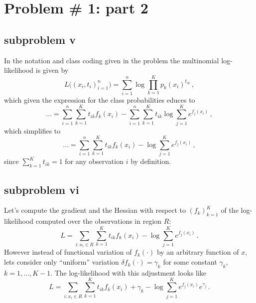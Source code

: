 \documentclass[a4paper]{article}
\begin{document}

\section{Problem \# 1: part 2} %
\label{sec:problem_1_part_2}

\subsection{subproblem v} %
\label{sub:subproblem_v}

In the notation and class coding given in the problem the multinomial log-likelihood
is given by
\[
L\bigl((x_i,t_i)_{i=1}^n\bigr) = \sum_{i=1}^n \log \prod_{k=1}^K p_k(x_i)^{t_{ik}} \,,
\]
which given the expression for the class probabilities educes to
\[
\ldots
= \sum_{i=1}^n \sum_{k=1}^K t_{ik} f_k(x_i)
- \sum_{i=1}^n \sum_{k=1}^K t_{ik} \log \sum_{j=1}^K e^{f_j(x_i)} \,,
\]
which simplifies to
\[
\ldots = \sum_{i=1}^n \sum_{k=1}^K t_{ik} f_k(x_i) - \log \sum_{j=1}^K e^{f_j(x_i)} \,,
\]
since $\sum_{k=1}^K t_{ik} = 1$ for any observation $i$ by definition.


\subsection{subproblem vi} %
\label{sub:subproblem_vi}

Let's compute the gradient and the Hessian with respect to $(f_k)_{k=1}^K$ of the
log-likelihood computed over the observations in region $R$:
\[ L = \sum_{i:x_i\in R} \sum_{k=1}^K t_{ik} f_k(x_i) - \log \sum_{j=1}^K e^{f_j(x_i)} \,. \]
However instead of functional variation of $f_k(\cdot)$ by an arbitrary function
of $x$, lets consider only ``uniform'' variation $\delta f_k(\cdot) = \gamma_k$ for
some constant $\gamma_k$, $k=1,\ldots, K-1$. The log-likelihood with this adjustment
looks like
\[
L = \sum_{i:x_i\in R} \sum_{k=1}^K t_{ik} f_k(x_i) + \gamma_k - \log \sum_{j=1}^K e^{f_j(x_i)}  e^{\gamma_j}\,.
\]
\end{document}
